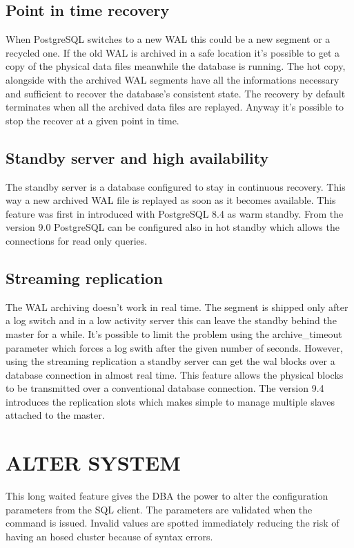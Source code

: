 \subsection{Point in time recovery}
When PostgreSQL switches to a new 
WAL this could be a new segment or a recycled one. If the old WAL is archived in a safe
location it's possible to get a copy of the physical data files meanwhile the database is running. 
The hot copy, alongside with the archived WAL segments have all the informations necessary and 
sufficient to recover the database's consistent state. The recovery by default terminates when all 
the archived data files are replayed. Anyway it's possible to stop the recover at a given point in 
time. 

\subsection{Standby server and high availability}
The standby server is a database configured to 
stay in continuous recovery. This way a new archived WAL file is replayed as soon as it becomes 
available. This feature was first in introduced with  PostgreSQL 8.4 as warm standby. From the version 9.0 PostgreSQL can be configured also in hot standby  
which allows the connections for read only queries.

\subsection{Streaming replication}
The WAL archiving doesn't work in real time. The segment is shipped only after a log switch and 
in a low activity server this can leave the standby behind the master for a while. It's  possible 
to limit the problem using the archive\_timeout parameter which forces a log swith after the given 
number of seconds. However, using the streaming replication a standby 
server can get the wal blocks over a database connection in almost real time. This feature allows 
the physical blocks to be transmitted over a conventional database connection. The version 9.4 introduces 
the replication slots which makes simple to manage multiple slaves attached to the master.

\section{ALTER SYSTEM}
This long waited feature gives the DBA the power to alter the configuration parameters
from the SQL client. The parameters are validated when the command is issued. Invalid values
are spotted immediately reducing the risk of having an hosed cluster because of syntax errors.


